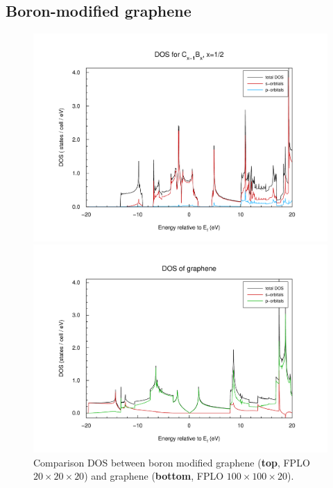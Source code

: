 			\subsection{Boron-modified graphene}
				\begin{figure}
					\begin{minipage}[t]{\textwidth}
						\includegraphics[width=\textwidth]{Results/Bor/Bor1R/dos.pdf}
					\end{minipage}
					\begin{minipage}[t]{\textwidth}
						\includegraphics[width=\textwidth]{Results/Graphene/GrapheneNew/dos.pdf}
					\end{minipage}		
					\caption{Comparison DOS between boron modified graphene (\textbf{top}, FPLO $20\times20\times20$) and graphene (\textbf{bottom}, FPLO $100\times100\times20$).}
					\label{fig:GrapheneBorDOSComparisson}
				\end{figure}
